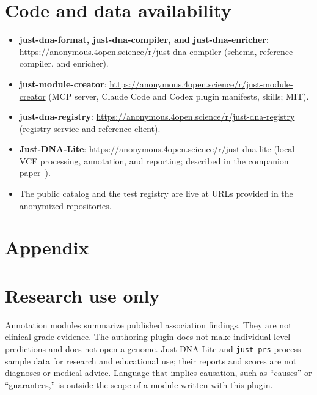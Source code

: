 \documentclass[11pt,a4paper]{article}
\begin{document}
\section{Code and data availability}
\label{sec:code}

\begin{itemize}
    \item \textbf{just-dna-format, just-dna-compiler, and just-dna-enricher}:
    \url{https://anonymous.4open.science/r/just-dna-compiler}
    (schema, reference compiler, and enricher).
    \item \textbf{just-module-creator}:
    \url{https://anonymous.4open.science/r/just-module-creator}
    (MCP server, Claude Code and Codex plugin manifests, skills; MIT).
    \item \textbf{just-dna-registry}:
    \url{https://anonymous.4open.science/r/just-dna-registry}
    (registry service and reference client).
    \item \textbf{Just-DNA-Lite}:
    \url{https://anonymous.4open.science/r/just-dna-lite}
    (local VCF processing, annotation, and reporting; described in the
    companion paper~\citep{companion2026justdnalite}).
    \item The public catalog and the test registry are live at URLs
    provided in the anonymized repositories.
\end{itemize}




\appendix
\section*{Appendix}

\section{Research use only}
\label{app:ruo}

Annotation modules summarize published association findings. They are not
clinical-grade evidence. The authoring plugin does not make individual-level
predictions and does not open a genome. Just-DNA-Lite and \texttt{just-prs}
process sample data for research and educational use; their reports and scores
are not diagnoses or medical advice. Language that implies causation, such as
``causes'' or ``guarantees,'' is outside the scope of a module written with this
plugin.
\end{document}
